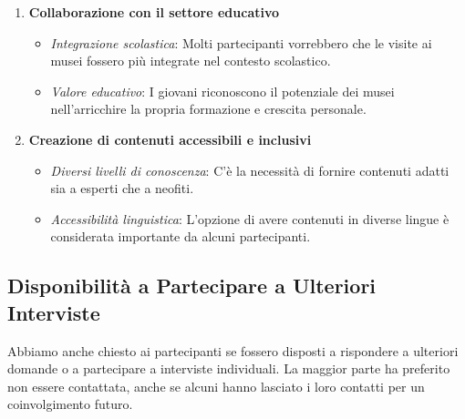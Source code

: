 \documentclass{article}
\begin{document}
\begin{enumerate}
    \item \textbf{Collaborazione con il settore educativo}
        \begin{itemize}
            \item \textit{Integrazione scolastica}: Molti partecipanti vorrebbero che le visite ai musei fossero più integrate nel contesto scolastico.
            \item \textit{Valore educativo}: I giovani riconoscono il potenziale dei musei nell'arricchire la propria formazione e crescita personale.
        \end{itemize}

    \item \textbf{Creazione di contenuti accessibili e inclusivi}
        \begin{itemize}
            \item \textit{Diversi livelli di conoscenza}: C'è la necessità di fornire contenuti adatti sia a esperti che a neofiti.
            \item \textit{Accessibilità linguistica}: L'opzione di avere contenuti in diverse lingue è considerata importante da alcuni partecipanti.
        \end{itemize}
\end{enumerate}

\subsection{Disponibilità a Partecipare a Ulteriori Interviste}

Abbiamo anche chiesto ai partecipanti se fossero disposti a rispondere a ulteriori domande o a partecipare a interviste individuali. La maggior parte ha preferito non essere contattata, anche se alcuni hanno lasciato i loro contatti per un coinvolgimento futuro.
\newpage
\end{document}
